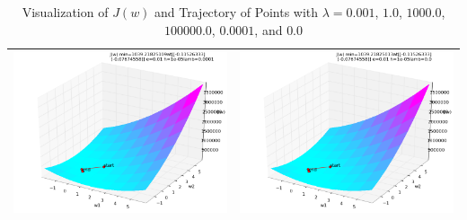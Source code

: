 \begin{itemize}
\begin{table}[ht]
\begin{tabular}{|c|c|}
\hline
\includegraphics[width=8cm]{JW5.png}&\includegraphics[width=8cm]{JW6.png}\\
\hline
\end{tabular}
\caption{Visualization of $J(w)$ and Trajectory of Points with $\lambda=0.001$, $1.0$, $1000.0$, $100000.0$, $0.0001$, and $0.0$}
\label{JW}
\end{table}


\end{itemize}

